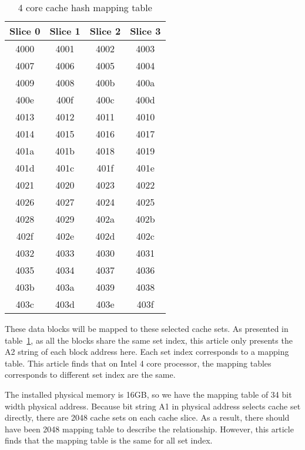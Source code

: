 \documentclass[conference]{IEEEtran}
\newcommand{\otoprule}{\midrule[\heavyrulewidth]}
\begin{document}
\begin{table}[!h]
\centering
\caption{4 core cache hash mapping table}
\label{tab:4CoreHashTable}
\begin{tabular}{cccc} 
	\toprule
Slice 0 & Slice 1 & Slice 2 & Slice 3 \\ \otoprule
4000 & 4001 & 4002 & 4003  \\ \midrule
4007 & 4006 & 4005 & 4004  \\ \midrule
4009 & 4008 & 400b & 400a  \\ \midrule
400e & 400f & 400c & 400d  \\ \midrule
4013 & 4012 & 4011 & 4010  \\ \midrule
4014 & 4015 & 4016 & 4017  \\ \midrule
401a & 401b & 4018 & 4019  \\ \midrule
401d & 401c & 401f & 401e  \\ \midrule
4021 & 4020 & 4023 & 4022  \\ \midrule
4026 & 4027 & 4024 & 4025  \\ \midrule
4028 & 4029 & 402a & 402b  \\ \midrule
402f & 402e & 402d & 402c  \\ \midrule
4032 & 4033 & 4030 & 4031  \\ \midrule
4035 & 4034 & 4037 & 4036  \\ \midrule
403b & 403a & 4039 & 4038  \\ \midrule
403c & 403d & 403e & 403f  \\ 
\bottomrule
\end{tabular}
\end{table}
These data blocks will be mapped to these selected cache sets. As presented in table~\ref{tab:4CoreHashTable}, as all the blocks share the same set index, this article only presents the A2 string of each block address here. 
Each set index corresponds to a mapping table. This article finds that on Intel 4 core processor, the mapping tables corresponds to different set index are the same.

The installed physical memory is 16GB, so we have the mapping table of 34 bit width physical address. Because bit string A1 in physical address selects cache set directly, there are 2048 cache sets on each cache slice. As a result, there should have been 2048 mapping table to describe the relationship. However, this article finds that the mapping table is the same for all set index. 
\end{document}
